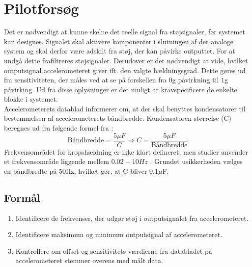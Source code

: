 \chapter{Pilotforsøg}\label{Bilag:Pilotforsoeg}
Det er nødvendigt at kunne skelne det reelle signal fra støjsignaler, før systemet kan designes. Signalet skal aktivere komponenter i slutningen af det analoge system og skal derfor være adskilt fra støj, der kan påvirke outputtet. For at undgå dette frafiltreres støjsignaler. Derudover er det nødvendigt at vide, hvilket outputsignal accelerometeret giver ift. den valgte hældningsgrad. Dette gøres ud fra sensitiviteten, der måles ved at se på forskellen fra $0$g påvirkning til $1$g påvirking. Ud fra disse oplysninger er det muligt at kravspecificere de enkelte blokke i systemet. \\ %
Accelerometerets datablad informerer om, at der skal benyttes kondensatorer til bestemmelsen af accelerometerets båndbredde. Kondensatoren størrelse (C) beregnes ud fra følgende formel fra \cite{Devices2009}:
\begin{equation}
\text{Båndbredde} = \dfrac{5\mu F}{C} \Rightarrow  C = \dfrac{5\mu F}{\text{Båndbredde}}
\end{equation}
Frekvensområdet for kropshældning er ikke klart defineret, men studier anvender et frekvensområde liggende mellem $0.02-10Hz$ \cite{Martinez-Mendez2011}. Grundet usikkerheden vælges en båndbredte på $50$Hz, hvilket gør, at C bliver $0.1\mu$F.

\section{Formål}
\begin{enumerate}
\item Identificere de frekvenser, der udgør støj i outputsignalet fra accelerometeret.
\item Identificere maksimum og minimum outputsignal af accelerometeret.
\item Kontrollere om offset og sensitivitets værdierne fra databladet på accelerometeret stemmer overens med målt data.
\end{enumerate}


